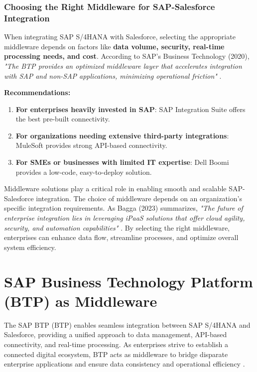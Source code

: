 \subsubsection{Choosing the Right Middleware for SAP-Salesforce Integration}
When integrating SAP S/4HANA with Salesforce, selecting the appropriate middleware depends on factors like \textbf{data volume, security, real-time processing needs, and cost}. According to SAP's Business Technology (2020), \textit{"The BTP provides an optimized middleware layer that accelerates integration with SAP and non-SAP applications, minimizing operational friction"} \cite{sap2020}.

\textbf{Recommendations:}
\begin{enumerate}
\item \textbf{For enterprises heavily invested in SAP}: SAP Integration Suite offers the best pre-built connectivity.
\item \textbf{For organizations needing extensive third-party integrations}: MuleSoft provides strong API-based connectivity.
\item \textbf{For SMEs or businesses with limited IT expertise}: Dell Boomi provides a low-code, easy-to-deploy solution.
\end{enumerate}

Middleware solutions play a critical role in enabling smooth and scalable SAP-Salesforce integration. The choice of middleware depends on an organization’s specific integration requirements. As Bagga (2023) summarizes, \textit{"The future of enterprise integration lies in leveraging iPaaS solutions that offer cloud agility, security, and automation capabilities"} \cite{bagga2023}. By selecting the right middleware, enterprises can enhance data flow, streamline processes, and optimize overall system efficiency.


\section{SAP Business Technology Platform (BTP) as Middleware}

The SAP BTP (BTP) enables seamless integration between SAP S/4HANA and Salesforce, providing a unified approach to data management, API-based connectivity, and real-time processing. As enterprises strive to establish a connected digital ecosystem, BTP acts as middleware to bridge disparate enterprise applications and ensure data consistency and operational efficiency \cite{sap2020}.

